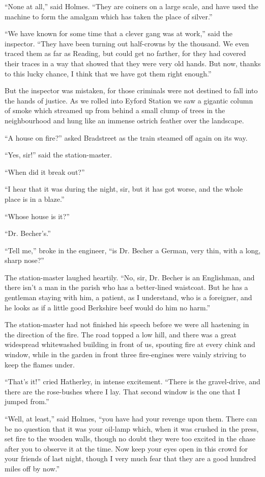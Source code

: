 \documentclass{article}
\begin{document}
``None at all,'' said Holmes. ``They are coiners on a large scale,
and have used the machine to form the amalgam which has taken the place
of silver.''

``We have known for some time that a clever gang was at work,'' said the
inspector. ``They have been turning out half-crowns by the thousand. We
even traced them as far as Reading, but could get no farther, for they
had covered their traces in a way that showed that they were very old
hands. But now, thanks to this lucky chance, I think that we have got
them right enough.''

But the inspector was mistaken, for those criminals were not destined to
fall into the hands of justice. As we rolled into Eyford Station we saw
a gigantic column of smoke which streamed up from behind a small clump
of trees in the neighbourhood and hung like an immense ostrich feather
over the landscape.

``A house on fire?'' asked Bradstreet as the train steamed off again on
its way.

``Yes, sir!'' said the station-master.

``When did it break out?''

``I hear that it was during the night, sir, but it has got worse, and
the whole place is in a blaze.''

``Whose house is it?''

``Dr. Becher's.''

``Tell me,'' broke in the engineer, ``is Dr. Becher a German, very thin,
with a long, sharp nose?''

The station-master laughed heartily. ``No, sir, Dr. Becher is an
Englishman, and there isn't a man in the parish who has a better-lined
waistcoat. But he has a gentleman staying with him, a patient, as
I understand, who is a foreigner, and he looks as if a little good
Berkshire beef would do him no harm.''

The station-master had not finished his speech before we were all
hastening in the direction of the fire. The road topped a low hill,
and there was a great widespread whitewashed building in front of us,
spouting fire at every chink and window, while in the garden in front
three fire-engines were vainly striving to keep the flames under.

``That's it!'' cried Hatherley, in intense excitement. ``There is the
gravel-drive, and there are the rose-bushes where I lay. That second
window is the one that I jumped from.''

``Well, at least,'' said Holmes, ``you have had your revenge upon
them. There can be no question that it was your oil-lamp which, when
it was crushed in the press, set fire to the wooden walls, though no
doubt they were too excited in the chase after you to observe it at the
time. Now keep your eyes open in this crowd for your friends of last
night, though I very much fear that they are a good hundred miles off
by now.''
\end{document}
